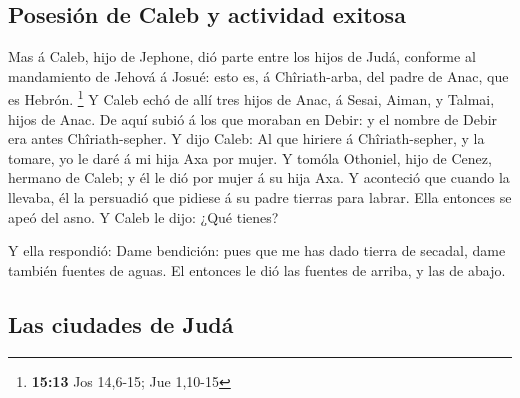 \hypertarget{posesiuxf3n-de-caleb-y-actividad-exitosa}{%
\subsection{Posesión de Caleb y actividad
exitosa}\label{posesiuxf3n-de-caleb-y-actividad-exitosa}}

 Mas á Caleb, hijo de Jephone, dió parte entre los hijos
de Judá, conforme al mandamiento de Jehová á Josué: esto es, á
Chîriath-arba, del padre de Anac, que es Hebrón. \footnote{\textbf{15:13}
  Jos 14,6-15; Jue 1,10-15}  Y Caleb echó de allí tres
hijos de Anac, á Sesai, Aiman, y Talmai, hijos de Anac. 
De aquí subió á los que moraban en Debir: y el nombre de Debir era antes
Chîriath-sepher.  Y dijo Caleb: Al que hiriere á
Chîriath-sepher, y la tomare, yo le daré á mi hija Axa por mujer.
 Y tomóla Othoniel, hijo de Cenez, hermano de Caleb; y él
le dió por mujer á su hija Axa.  Y aconteció que cuando
la llevaba, él la persuadió que pidiese á su padre tierras para labrar.
Ella entonces se apeó del asno. Y Caleb le dijo: ¿Qué tienes?

 Y ella respondió: Dame bendición: pues que me has dado
tierra de secadal, dame también fuentes de aguas. El entonces le dió las
fuentes de arriba, y las de abajo.

\hypertarget{las-ciudades-de-juduxe1}{%
\subsection{Las ciudades de Judá}\label{las-ciudades-de-juduxe1}}

